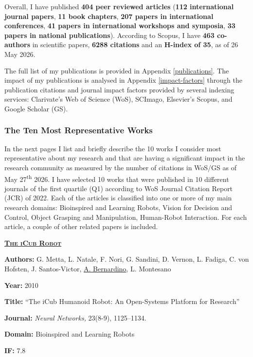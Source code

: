 Overall, I have published \textbf{404 peer reviewed articles}
(\textbf{112 international journal papers}, \textbf{11 book chapters},
\textbf{207 papers in international conferences}, \textbf{41 papers in
international workshops and symposia}, \textbf{33 papers in national
publications}). According to Scopus, I have \textbf{463 co-authors} in
scientific papers, \textbf{6288 citations} and an \textbf{H-index of
35}, as of 26 May 2026.

The full list of my publications is provided in Appendix \ref{publications}. The impact
of my publications is analysed in Appendix \ref{impact-factors} through the publication
citations and journal impact factors provided by several indexing
services: Clarivate's Web of Science (WoS), SCImago, Elsevier's Scopus,
and Google Scholar (GS).

\subsubsection{The Ten Most Representative
Works}\label{the-ten-most-representative-works}


In the next pages I list and briefly describe the 10 works I consider most
representative about my research and that are having a significant
impact in the research community as measured by the number of citations
in WoS/GS as of May 27\textsuperscript{th} 2026. I have selected 10
works that were published in 10 different journals of the first quartile
(Q1) according to WoS Journal Citation Report (JCR) of 2022. Each of the
articles is classified into one or more of my main research domains:
Bioinspired and Learning Robots, Vision for Decision and Control, Object
Grasping and Manipulation, Human-Robot Interaction. For each article, a
couple of other related papers is included.

\clearpage

\textbf{\textsc{\ul{The iCub Robot}}}

\textbf{Authors:} G. Metta, L. Natale, F. Nori, G. Sandini, D. Vernon,
L. Fadiga, C. von Hofsten, J. Santos-Victor, \ul{A. Bernardino}, L.
Montesano

\textbf{Year:} 2010

\textbf{Title:} ``The iCub Humanoid Robot: An Open-Systems Platform for
Research''

\textbf{Journal:} \emph{Neural Networks,} 23(8-9), 1125--1134.

\textbf{Domain:} Bioinspired and Learning Robots

\textbf{IF:} 7.8

